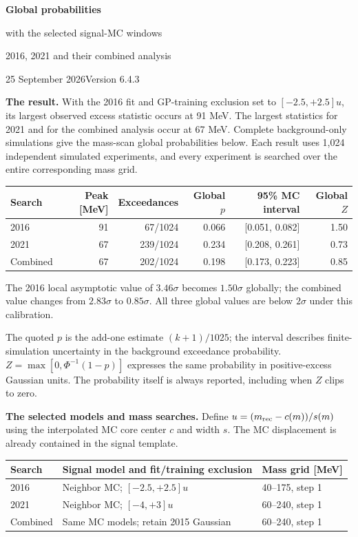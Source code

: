 \documentclass[11pt]{article}
\begin{document}
{\LARGE\bfseries Global probabilities\par with the selected signal-MC windows}\par
{\large 2016, 2021 and their combined analysis}\par
25 September 2026\hfill Version 6.4.3

\textbf{The result.} With the 2016 fit and GP-training exclusion set to $[-2.5,+2.5]u$, its largest observed excess statistic occurs at 91 MeV. The largest statistics for 2021 and for the combined analysis occur at 67 MeV. Complete background-only simulations give the mass-scan global probabilities below. Each result uses 1,024 independent simulated experiments, and every experiment is searched over the entire corresponding mass grid.

\begin{center}\small\begin{tabular}{lrrrrr}\toprule
Search & Peak [MeV] & Exceedances & Global $p$ & 95\% MC interval & Global $Z$\\\midrule
2016 & 91 & 67/1024 & 0.066 & [0.051, 0.082] & 1.50\\
2021 & 67 & 239/1024 & 0.234 & [0.208, 0.261] & 0.73\\
Combined & 67 & 202/1024 & 0.198 & [0.173, 0.223] & 0.85\\
\bottomrule\end{tabular}\end{center}

The 2016 local asymptotic value of $3.46\sigma$ becomes $1.50\sigma$ globally; the combined value changes from $2.83\sigma$ to $0.85\sigma$. All three global values are below $2\sigma$ under this calibration.

The quoted $p$ is the add-one estimate $(k+1)/1025$; the interval describes finite-simulation uncertainty in the background exceedance probability. $Z=\max[0,\Phi^{-1}(1-p)]$ expresses the same probability in positive-excess Gaussian units. The probability itself is always reported, including when $Z$ clips to zero.

\textbf{The selected models and mass searches.} Define $u=(m_{\rm rec}-c(m))/s(m)$ using the interpolated MC core center $c$ and width $s$. The MC displacement is already contained in the signal template.

\begin{center}\small\begin{tabular}{lll}\toprule
Search & Signal model and fit/training exclusion & Mass grid [MeV]\\\midrule
2016 & Neighbor MC; $[-2.5,+2.5]u$ & 40--175, step 1\\
2021 & Neighbor MC; $[-4,+3]u$ & 60--240, step 1\\
Combined & Same MC models; retain 2015 Gaussian & 60--240, step 1\\\bottomrule
\end{tabular}\end{center}
\end{document}

